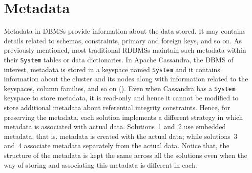 \section{Metadata}\label{s:Metadata}
Metadata in \acp{DBMS} provide information about the data stored. It may
contains details related to schemas, constraints,  primary and foreign keys, and
so on.   As previously mentioned,  most traditional \acp{RDBMS} maintain such
metadata within their \texttt{System}  tables or data dictionaries.  
In Apache Cassandra, the \ac{DBMS} of interest, metadata is stored in a 
keyspace named \texttt{System} and it contains information
about the cluster and its nodes along with information related to the
keyspaces, column families, and so on ().
 Even when Cassandra has a  \texttt{System} keyspace to store metadata, it 
 is read-only and hence it cannot be modified to store additional metadata
 about referential integrity constraints. 
Hence,  for preserving the metadata, each 
solution implements a  different strategy in which metadata is associated
with actual data. Solutions~1 and~2 use embedded metadata, that is, metadata
is created with the actual data; while solutions~3 and~4
associate metadata separately from the actual data.  Notice that, the structure
 of the metadata is kept the same across all the solutions even when  the way of
 storing and associating this metadata is different in each. 

